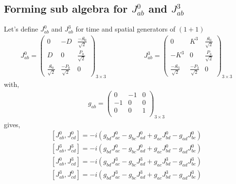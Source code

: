 \documentclass[]{article}
\numberwithin{equation}{section}
\begin{document}
{{\subsection{Forming sub algebra for $J^{0}_{ab}$ and $J^{3}_{ab}$}
Let's define $J^{0}_{ab}$ and $J^{3}_{ab}$ for time and spatial generators of $(1+1)$
\begin{align}
  J^{0}_{ab}=
  \begin{pmatrix}
  0&-D&\frac{-\mathfrak{K}_0}{\sqrt{2}}\\
  D&0&\frac{P_0}{\sqrt{2}}\\
    \frac{\mathfrak{K}_0}{\sqrt{2}}&\frac{-P_0}{\sqrt{2}}&0  
  \end{pmatrix}_{3\times3}     ~~~~~~~~~~~~~~~~~~~~~~~~~ J^{3}_{ab}=
  \begin{pmatrix}
  0&K^3&\frac{\mathfrak{K}_3}{\sqrt{2}}\\
  -K^3&0&\frac{P_3}{\sqrt{2}}\\
    \frac{-\mathfrak{K}_3}{\sqrt{2}}&\frac{-P_3}{\sqrt{2}}&0  
  \end{pmatrix}_{3\times3}
\end{align}
with,
\begin{align}
      g_{ab}=\begin{pmatrix}
  0&-1&0\\
  -1&0&0\\
  0&0&1\\
  \end{pmatrix}_{3\times3}
  \end{align}
gives,
\begin{align}
      \left[J^{0}_{{a}{b}},J^{0}_{{c}{d}}\right]=-i\left(g_{{b}{d}}J^{0}_{{a}{c}}-g_{{b}{c}}J^{0}_{{a}{d}}+g_{{a}{c}}J^{0}_{{b}{d}}-g_{{a}{d}}J^{0}_{{b}{c}}\right)\\
      \left[J^{3}_{{a}{b}},J^{3}_{{c}{d}}\right]=-i\left(g_{{b}{d}}J^{0}_{{a}{c}}-g_{{b}{c}}J^{0}_{{a}{d}}+g_{{a}{c}}J^{0}_{{b}{d}}-g_{{a}{d}}J^{0}_{{b}{c}}\right)\\
      \left[J^{0}_{{a}{b}},J^{3}_{{c}{d}}\right]=-i\left(g_{{b}{d}}J^{3}_{{a}{c}}-g_{{b}{c}}J^{3}_{{a}{d}}+g_{{a}{c}}J^{3}_{{b}{d}}-g_{{a}{d}}J^{3}_{{b}{c}}\right)\\
      \left[J^{3}_{{a}{b}},J^{0}_{{c}{d}}\right]=-i\left(g_{{b}{d}}J^{3}_{{a}{c}}-g_{{b}{c}}J^{3}_{{a}{d}}+g_{{a}{c}}J^{3}_{{b}{d}}-g_{{a}{d}}J^{3}_{{b}{c}}\right)
  \end{align}

}}
\end{document}
